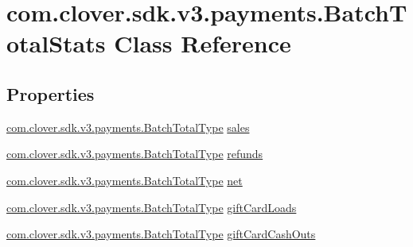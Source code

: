 \hypertarget{classcom_1_1clover_1_1sdk_1_1v3_1_1payments_1_1_batch_total_stats}{}\section{com.\+clover.\+sdk.\+v3.\+payments.\+Batch\+Total\+Stats Class Reference}
\label{classcom_1_1clover_1_1sdk_1_1v3_1_1payments_1_1_batch_total_stats}
\subsection*{Properties}
\begin{DoxyCompactItemize}
\item 
\hyperlink{classcom_1_1clover_1_1sdk_1_1v3_1_1payments_1_1_batch_total_type}{com.\+clover.\+sdk.\+v3.\+payments.\+Batch\+Total\+Type} \hyperlink{classcom_1_1clover_1_1sdk_1_1v3_1_1payments_1_1_batch_total_stats_aa3f0a3698764334b0ce30ecc97e9ba44}{sales}
\item 
\hyperlink{classcom_1_1clover_1_1sdk_1_1v3_1_1payments_1_1_batch_total_type}{com.\+clover.\+sdk.\+v3.\+payments.\+Batch\+Total\+Type} \hyperlink{classcom_1_1clover_1_1sdk_1_1v3_1_1payments_1_1_batch_total_stats_a27ad66100138c942444268df1d7810a1}{refunds}
\item 
\hyperlink{classcom_1_1clover_1_1sdk_1_1v3_1_1payments_1_1_batch_total_type}{com.\+clover.\+sdk.\+v3.\+payments.\+Batch\+Total\+Type} \hyperlink{classcom_1_1clover_1_1sdk_1_1v3_1_1payments_1_1_batch_total_stats_aa4b548f2b60d651f348a5014fe4a8e59}{net}
\item 
\hyperlink{classcom_1_1clover_1_1sdk_1_1v3_1_1payments_1_1_batch_total_type}{com.\+clover.\+sdk.\+v3.\+payments.\+Batch\+Total\+Type} \hyperlink{classcom_1_1clover_1_1sdk_1_1v3_1_1payments_1_1_batch_total_stats_a09984b113532a97d133c6aa9f08e3755}{gift\+Card\+Loads}
\item 
\hyperlink{classcom_1_1clover_1_1sdk_1_1v3_1_1payments_1_1_batch_total_type}{com.\+clover.\+sdk.\+v3.\+payments.\+Batch\+Total\+Type} \hyperlink{classcom_1_1clover_1_1sdk_1_1v3_1_1payments_1_1_batch_total_stats_ae52561b0f81aeae3c505715ec32deedd}{gift\+Card\+Cash\+Outs}

\end{DoxyCompactItemize}
